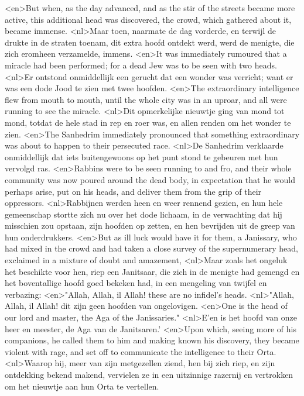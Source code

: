 <en>But when, as the day advanced, and as the stir of the streets became more active, this additional head was discovered, the crowd, which gathered about it, became immense.
<nl>Maar toen, naarmate de dag vorderde, en terwijl de drukte in de straten toenam,  dit extra hoofd ontdekt werd, werd de menigte, die zich eromheen verzamelde, immens.
<en>It was immediately rumoured that a miracle had been performed; for a dead Jew was to be seen with two heads.
<nl>Er ontstond  onmiddellijk een gerucht dat een wonder was verricht; want er was een dode Jood te zien met twee hoofden.
<en>The extraordinary intelligence flew from mouth to mouth, until the whole city was in an uproar, and all were running to see the miracle.
<nl>Dit opmerkelijke nieuwtje ging van mond tot mond, totdat de hele stad in rep en roer was, en allen renden om het wonder te zien.
<en>The Sanhedrim immediately pronounced that something extraordinary was about to happen to their persecuted race.
<nl>De Sanhedrim verklaarde onmiddellijk dat iets buitengewoons op het punt stond te gebeuren met hun vervolgd ras.
<en>Rabbins were to be seen running to and fro, and their whole community was now poured around the dead body, in expectation that he would perhaps arise, put on his heads, and deliver them from the grip of their oppressors.
<nl>Rabbijnen werden heen en weer rennend gezien, en hun hele gemeenschap stortte zich nu over het dode lichaam, in de verwachting dat hij misschien zou opstaan,  zijn hoofden  op zetten, en hen  bevrijden uit de greep van hun onderdrukkers.
<en>But as ill luck would have it for them, a Janissary, who had mixed in the crowd and had taken a close survey of the supernumerary head, exclaimed in a mixture of doubt and amazement, 
<nl>Maar zoals het ongeluk het beschikte voor hen, riep een Janitsaar, die zich in de menigte had gemengd en  het boventallige hoofd goed bekeken had, in een mengeling van twijfel en verbazing: 
<en>"Allah, Allah, il Allah! these are no infidel's heads.
<nl>"Allah, Allah, il Allah! dit zijn geen hoofden van ongelovigen.
<en>One is the head of our lord and master, the Aga of the Janissaries."
<nl>E'en is het hoofd van onze heer en meester, de Aga van de Janitsaren.'
<en>Upon which, seeing more of his companions, he called them to him and making known his discovery, they became violent with rage, and set off to communicate the intelligence to their Orta.
<nl>Waarop hij, meer van zijn metgezellen ziend, hen bij zich riep, en zijn ontdekking bekend makend, vervielen  ze in een uitzinnige razernij en vertrokken om het nieuwtje aan hun Orta te vertellen.
